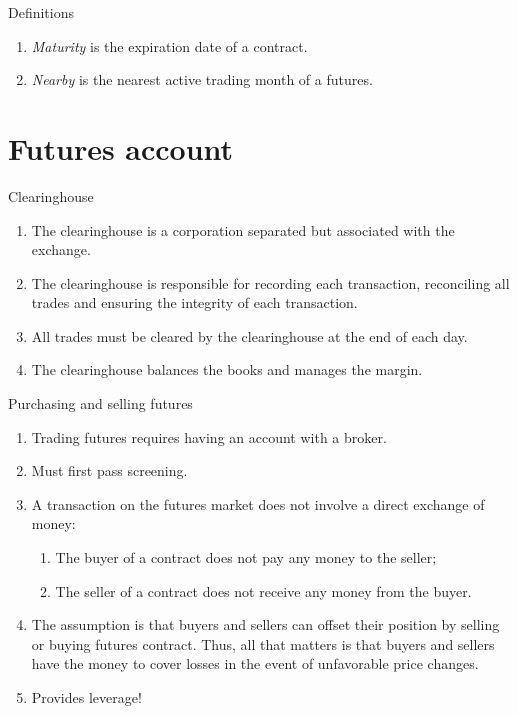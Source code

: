 \documentclass[table,xcolor=pdftex,dvipsnames]{beamer}\usepackage[]{graphicx}\usepackage[]{color}
\begin{document}

\begin{frame}{Definitions}
\begin{enumerate}[label=\textbullet]
      \item \emph{Maturity} is the expiration date of a contract.
      \item \emph{Nearby} is the nearest active trading month of a futures.
\end{enumerate}
\end{frame}

\section{Futures account}

\begin{frame}{Clearinghouse}
\begin{enumerate}[label=\textbullet]
    \item The clearinghouse is a corporation separated but associated with the exchange.
    \item The clearinghouse is responsible for recording each transaction, reconciling all trades and ensuring the integrity of each transaction.
    \item All trades must be cleared by the clearinghouse at the end of each day.
    \item The clearinghouse balances the books and manages the margin.
\end{enumerate}
\end{frame}



\begin{frame}{Purchasing and selling futures}
\begin{enumerate}[label=\textbullet]
      \item Trading futures requires having an account with a broker.
      \item Must first pass screening.
      \item A transaction on the futures market does not involve a direct exchange of money:
        \begin{enumerate}[label=-]
          \item The buyer of a contract does not pay any money to the seller;
          \item The seller of a contract does not receive any money from the buyer.
        \end{enumerate}
      \item The assumption is that buyers and sellers can offset their position by selling or buying futures contract. Thus, all that matters is that buyers and sellers have the money to cover losses in the event of unfavorable price changes.
      \item Provides leverage!
\end{enumerate}
\end{frame}
\end{document}
